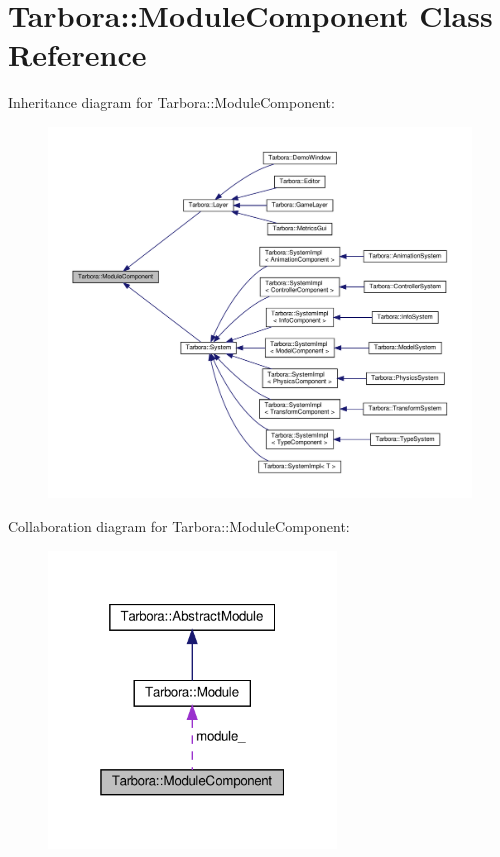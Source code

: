 \hypertarget{classTarbora_1_1ModuleComponent}{}\section{Tarbora\+:\+:Module\+Component Class Reference}
\label{classTarbora_1_1ModuleComponent}


Inheritance diagram for Tarbora\+:\+:Module\+Component\+:\nopagebreak
\begin{figure}[H]
\begin{center}
\leavevmode
\includegraphics[width=350pt]{classTarbora_1_1ModuleComponent__inherit__graph}
\end{center}
\end{figure}


Collaboration diagram for Tarbora\+:\+:Module\+Component\+:\nopagebreak
\begin{figure}[H]
\begin{center}
\leavevmode
\includegraphics[width=217pt]{classTarbora_1_1ModuleComponent__coll__graph}
\end{center}
\end{figure}
